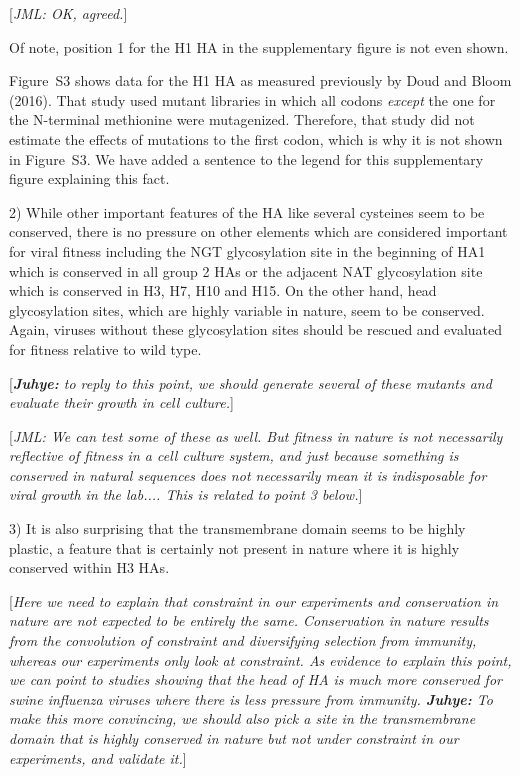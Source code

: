 \documentclass[11pt, oneside]{article}   	%
\newcommand{\comment}[1]{{\color{red}[\textsl{#1}]}}
\newcommand{\response}[1]{{\color{black}#1}}
\begin{document}
\comment{JML: OK, agreed.}

Of note, position 1 for the H1 HA in the supplementary figure is not even shown. 

\response{Figure~S3 shows data for the H1 HA as measured previously by Doud and Bloom (2016). 
That study used mutant libraries in which all codons \emph{except} the one for the N-terminal methionine were mutagenized.
Therefore, that study did not estimate the effects of mutations to the first codon, which is why it is not shown in Figure~S3.
We have added a sentence to the legend for this supplementary figure explaining this fact.
}

2) While other important features of the HA like several cysteines seem to be conserved, there is no pressure on other elements which are considered important for viral fitness including the NGT glycosylation site in the beginning of HA1 which is conserved in all group 2 HAs or the adjacent NAT glycosylation site which is conserved in H3, H7, H10 and H15. On the other hand, head glycosylation sites, which are highly variable in nature, seem to be conserved. Again, viruses without these glycosylation sites should be rescued and evaluated for fitness relative to wild type. 

\comment{{\bf Juhye:} to reply to this point, we should generate several of these mutants and evaluate their growth in cell culture.}

\comment{JML: We can test some of these as well. But fitness in nature is not necessarily reflective of fitness in a cell culture system, and just because something is conserved in natural sequences does not necessarily mean it is indisposable for viral growth in the lab.... This is related to point 3 below.}

3) It is also surprising that the transmembrane domain seems to be highly plastic, a feature that is certainly not present in nature where it is highly conserved within H3 HAs. 

\comment{Here we need to explain that constraint in our experiments and conservation in nature are not expected to be entirely the same.
Conservation in nature results from the convolution of constraint and diversifying selection from immunity, whereas our experiments only look at constraint.
As evidence to explain this point, we can point to studies showing that the head of HA is much more conserved for swine influenza viruses where there is less pressure from immunity.
{\bf Juhye:} To make this more convincing, we should also pick a site in the transmembrane domain that is highly conserved in nature but not under constraint in our experiments, and validate it.}
\end{document}
